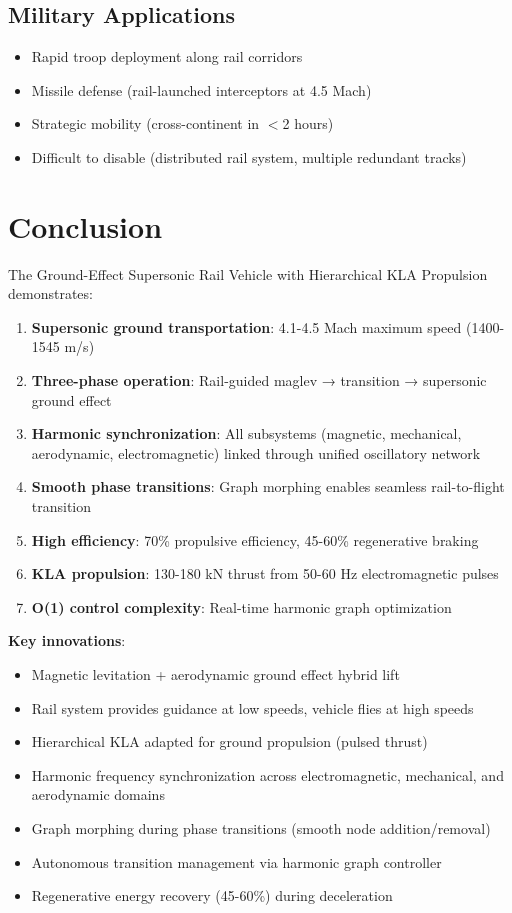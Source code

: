 \documentclass[12pt,a4paper]{article}
\begin{document}
\subsection{Military Applications}

\begin{itemize}
\item Rapid troop deployment along rail corridors
\item Missile defense (rail-launched interceptors at 4.5 Mach)
\item Strategic mobility (cross-continent in $<$2 hours)
\item Difficult to disable (distributed rail system, multiple redundant tracks)
\end{itemize}

\section{Conclusion}

The Ground-Effect Supersonic Rail Vehicle with Hierarchical KLA Propulsion demonstrates:

\begin{enumerate}
\item \textbf{Supersonic ground transportation}: 4.1-4.5 Mach maximum speed (1400-1545 m/s)
\item \textbf{Three-phase operation}: Rail-guided maglev → transition → supersonic ground effect
\item \textbf{Harmonic synchronization}: All subsystems (magnetic, mechanical, aerodynamic, electromagnetic) linked through unified oscillatory network
\item \textbf{Smooth phase transitions}: Graph morphing enables seamless rail-to-flight transition
\item \textbf{High efficiency}: 70\% propulsive efficiency, 45-60\% regenerative braking
\item \textbf{KLA propulsion}: 130-180 kN thrust from 50-60 Hz electromagnetic pulses
\item \textbf{O(1) control complexity}: Real-time harmonic graph optimization
\end{enumerate}

\textbf{Key innovations}:
\begin{itemize}
\item Magnetic levitation + aerodynamic ground effect hybrid lift
\item Rail system provides guidance at low speeds, vehicle flies at high speeds
\item Hierarchical KLA adapted for ground propulsion (pulsed thrust)
\item Harmonic frequency synchronization across electromagnetic, mechanical, and aerodynamic domains
\item Graph morphing during phase transitions (smooth node addition/removal)
\item Autonomous transition management via harmonic graph controller
\item Regenerative energy recovery (45-60\%) during deceleration
\end{itemize}
\end{document}
